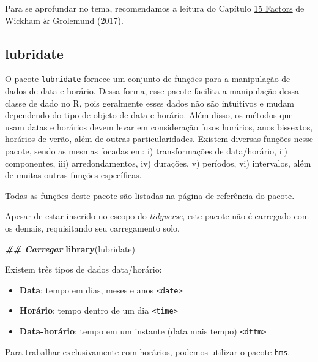 \documentclass[
]{article}
\newenvironment{Shaded}{\begin{snugshade}}{\end{snugshade}}
\newcommand{\DocumentationTok}[1]{\textcolor[rgb]{0.56,0.35,0.01}{\textbf{\textit{#1}}}}
\newcommand{\FunctionTok}[1]{\textcolor[rgb]{0.13,0.29,0.53}{\textbf{#1}}}
\newcommand{\NormalTok}[1]{#1}
\providecommand{\tightlist}{%
  \setlength{\itemsep}{0pt}\setlength{\parskip}{0pt}}
\begin{document}
Para se aprofundar no tema, recomendamos a leitura do Capítulo \href{https://r4ds.had.co.nz/factors.html}{15 Factors} de Wickham \& Grolemund (2017).

\hypertarget{lubridate}{%
\subsection{lubridate}\label{lubridate}}

O pacote \texttt{lubridate} fornece um conjunto de funções para a manipulação de dados de data e horário. Dessa forma, esse pacote facilita a manipulação dessa classe de dado no R, pois geralmente esses dados não são intuitivos e mudam dependendo do tipo de objeto de data e horário. Além disso, os métodos que usam datas e horários devem levar em consideração fusos horários, anos bissextos, horários de verão, além de outras particularidades. Existem diversas funções nesse pacote, sendo as mesmas focadas em: i) transformações de data/horário, ii) componentes, iii) arredondamentos, iv) durações, v) períodos, vi) intervalos, além de muitas outras funções específicas.

Todas as funções deste pacote são listadas na \href{https://lubridate.tidyverse.org/reference/index.html}{página de referência} do pacote.

Apesar de estar inserido no escopo do \emph{tidyverse}, este pacote não é carregado com os demais, requisitando seu carregamento solo.

\begin{Shaded}
\begin{Highlighting}[]
\DocumentationTok{\#\# Carregar}
\FunctionTok{library}\NormalTok{(lubridate)}
\end{Highlighting}
\end{Shaded}

Existem três tipos de dados data/horário:

\begin{itemize}
\tightlist
\item
  \textbf{Data}: tempo em dias, meses e anos \texttt{\textless{}date\textgreater{}}
\item
  \textbf{Horário}: tempo dentro de um dia \texttt{\textless{}time\textgreater{}}
\item
  \textbf{Data-horário}: tempo em um instante (data mais tempo) \texttt{\textless{}dttm\textgreater{}}
\end{itemize}

Para trabalhar exclusivamente com horários, podemos utilizar o pacote \texttt{hms}.
\end{document}
